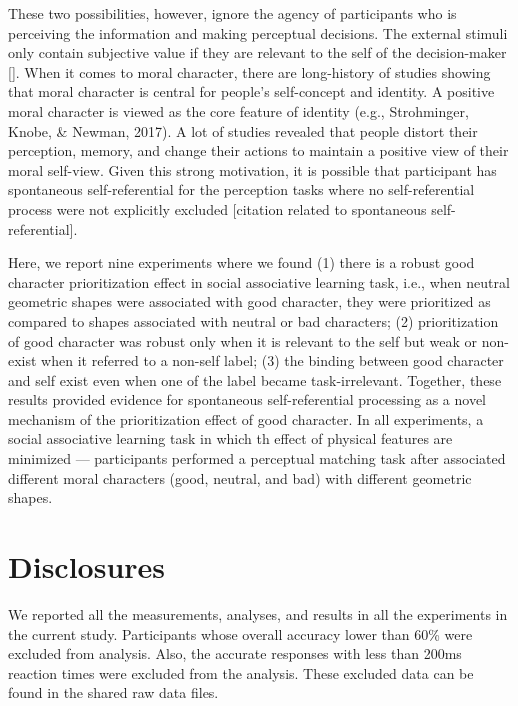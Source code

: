 \documentclass[
  man]{apa6}
\begin{document}
These two possibilities, however, ignore the agency of participants who is perceiving the information and making perceptual decisions. The external stimuli only contain subjective value if they are relevant to the self of the decision-maker {[}{]}. When it comes to moral character, there are long-history of studies showing that moral character is central for people's self-concept and identity. A positive moral character is viewed as the core feature of identity (e.g., Strohminger, Knobe, \& Newman, 2017). A lot of studies revealed that people distort their perception, memory, and change their actions to maintain a positive view of their moral self-view. Given this strong motivation, it is possible that participant has spontaneous self-referential for the perception tasks where no self-referential process were not explicitly excluded {[}citation related to spontaneous self-referential{]}.

Here, we report nine experiments where we found (1) there is a robust good character prioritization effect in social associative learning task, i.e., when neutral geometric shapes were associated with good character, they were prioritized as compared to shapes associated with neutral or bad characters; (2) prioritization of good character was robust only when it is relevant to the self but weak or non-exist when it referred to a non-self label; (3) the binding between good character and self exist even when one of the label became task-irrelevant. Together, these results provided evidence for spontaneous self-referential processing as a novel mechanism of the prioritization effect of good character. In all experiments, a social associative learning task in which th effect of physical features are minimized --- participants performed a perceptual matching task after associated different moral characters (good, neutral, and bad) with different geometric shapes.

\hypertarget{disclosures}{%
\section{Disclosures}\label{disclosures}}

We reported all the measurements, analyses, and results in all the experiments in the current study. Participants whose overall accuracy lower than 60\% were excluded from analysis. Also, the accurate responses with less than 200ms reaction times were excluded from the analysis. These excluded data can be found in the shared raw data files.
\end{document}
